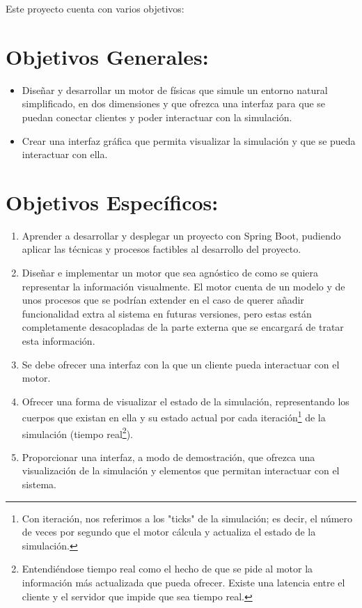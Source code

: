 
Este proyecto cuenta con varios objetivos: 

\section{Objetivos Generales:}

\begin{itemize}
    \item Diseñar y desarrollar un motor de físicas que simule un entorno natural simplificado, en dos dimensiones y que ofrezca una interfaz para que se puedan conectar clientes  y poder interactuar con la simulación.
    \item Crear una interfaz gráfica que permita visualizar la simulación y que se pueda interactuar con ella.
\end{itemize}

 
 \section{Objetivos Específicos:}
 
 
 \begin{enumerate}
     
     \item Aprender a desarrollar y desplegar un proyecto con Spring Boot, pudiendo aplicar las técnicas y procesos factibles al desarrollo del proyecto.
    
     \item Diseñar e implementar un motor que sea agnóstico de como se quiera representar la información visualmente. El motor cuenta de un modelo y de unos procesos que se podrían extender en el caso de querer añadir funcionalidad extra al sistema en futuras versiones, pero estas están completamente desacopladas de la parte externa que se encargará de tratar esta información.

    \item Se debe ofrecer una interfaz con la que un cliente pueda interactuar con el motor.
     
     \item Ofrecer una forma de visualizar el estado de la simulación, representando los cuerpos que existan en ella y su estado actual por cada iteración\footnote{Con iteración, nos referimos a los "ticks" de la simulación; es decir, el número de veces por segundo que el motor cálcula y actualiza el estado de la simulación.} de la simulación (tiempo real\footnote{Entendiéndose tiempo real como el hecho de que se pide al motor la información más actualizada que pueda ofrecer. Existe una latencia entre el cliente y el servidor que impide que sea tiempo real. }).
     
     \item Proporcionar una interfaz, a modo de demostración, que ofrezca una visualización de la simulación y elementos que permitan interactuar con el sistema.
     
 \end{enumerate}